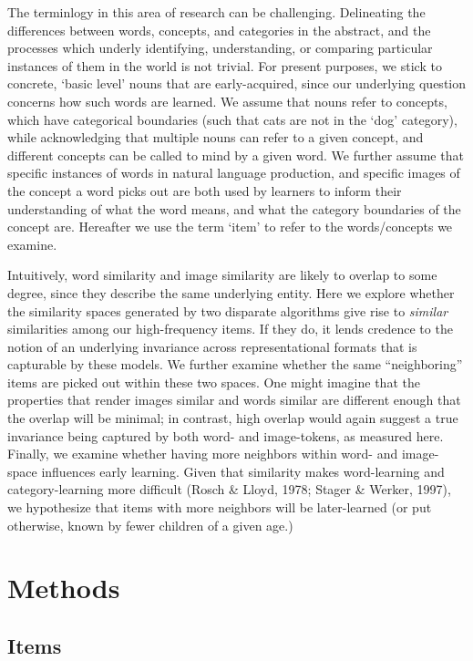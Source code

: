 \documentclass[10pt, letterpaper]{article}
\begin{document}
The terminlogy in this area of research can be challenging. Delineating
the differences between words, concepts, and categories in the abstract,
and the processes which underly identifying, understanding, or comparing
particular instances of them in the world is not trivial. For present
purposes, we stick to concrete, `basic level' nouns that are
early-acquired, since our underlying question concerns how such words
are learned. We assume that nouns refer to concepts, which have
categorical boundaries (such that cats are not in the `dog' category),
while acknowledging that multiple nouns can refer to a given concept,
and different concepts can be called to mind by a given word. We further
assume that specific instances of words in natural language production,
and specific images of the concept a word picks out are both used by
learners to inform their understanding of what the word means, and what
the category boundaries of the concept are. Hereafter we use the term
`item' to refer to the words/concepts we examine.

Intuitively, word similarity and image similarity are likely to overlap
to some degree, since they describe the same underlying entity. Here we
explore whether the similarity spaces generated by two disparate
algorithms give rise to \emph{similar} similarities among our
high-frequency items. If they do, it lends credence to the notion of an
underlying invariance across representational formats that is capturable
by these models. We further examine whether the same ``neighboring''
items are picked out within these two spaces. One might imagine that the
properties that render images similar and words similar are different
enough that the overlap will be minimal; in contrast, high overlap would
again suggest a true invariance being captured by both word- and
image-tokens, as measured here. Finally, we examine whether having more
neighbors within word- and image-space influences early learning. Given
that similarity makes word-learning and category-learning more difficult
(Rosch \& Lloyd, 1978; Stager \& Werker, 1997), we hypothesize that
items with more neighbors will be later-learned (or put otherwise, known
by fewer children of a given age.)

\section{Methods}\label{methods}

\subsection{Items}\label{items}
\end{document}
